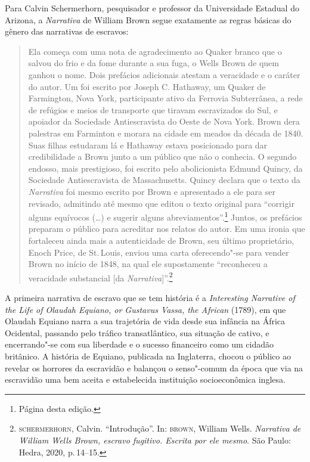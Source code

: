Para Calvin Schermerhorn, pesquisador e professor da Universidade Estadual do Arizona,
a \emph{Narrativa} de William Brown segue exatamente as regras básicas do gênero
das narrativas de escravos:

\begin{quote}
Ela começa com uma nota de agradecimento ao
Quaker branco que o salvou do frio e da fome durante a sua fuga, o Wells
Brown de quem ganhou o nome. Dois prefácios adicionais atestam a
veracidade e o caráter do autor. Um foi escrito por Joseph C. Hathaway,
um Quaker de Farmington, Nova York, participante ativo da Ferrovia
Subterrânea, a rede de refúgios e meios de transporte que tiravam
escravizados do Sul, e apoiador da Sociedade Antiescravista do Oeste de Nova
York. Brown dera palestras em Farminton e morara na cidade em meados da
década de 1840. Suas filhas estudaram lá e Hathaway estava posicionado
para dar credibilidade a Brown junto a um público que não o conhecia. O
segundo endosso, mais prestigioso, foi escrito pelo abolicionista Edmund
Quincy, da Sociedade Antiescravista de Massachusetts. Quincy declara que
o texto da \emph{Narrativa} foi mesmo escrito por Brown e apresentado a
ele para ser revisado, admitindo até mesmo que editou o texto original
para ``corrigir alguns equívocos (\ldots{}) e sugerir alguns
abreviamentos''.\footnote{Página \pageref{ref1} desta edição.} Juntos, os prefácios
preparam o público para acreditar nos relatos do autor. Em uma ironia
que fortaleceu ainda mais a autenticidade de Brown, seu último
proprietário, Enoch Price, de St.\,Louis, enviou uma carta oferecendo"-se
para vender Brown no início de 1848, na qual ele supostamente
``reconheceu a veracidade substancial {[}da \emph{Narrativa}{]}''.\footnote{\textsc{schermerhorn}, Calvin. ``Introdução''. In: \textsc{brown}, William Wells. \textit{Narrativa de William Wells Brown,
escravo fugitivo. Escrita por ele mesmo}. São Paulo: Hedra, 2020, p.\,14--15.}
\end{quote}

A primeira narrativa de escravo que se tem história é a 
\textit{Interesting Narrative of the Life of Olaudah Equiano, or Gustavus Vassa, the African}
(1789), em que Olaudah Equiano narra a sua trajetória de vida desde sua infância na África Ocidental, passando pelo tráfico transatlântico, sua situação de cativo, e encerrando"-se com sua liberdade e o sucesso financeiro como um cidadão britânico.
A história de Equiano, publicada na Inglaterra, chocou o público ao revelar os horrores da escravidão e balançou o senso"-comum da época que via na escravidão uma bem aceita e estabelecida instituição socioeconômica inglesa.

